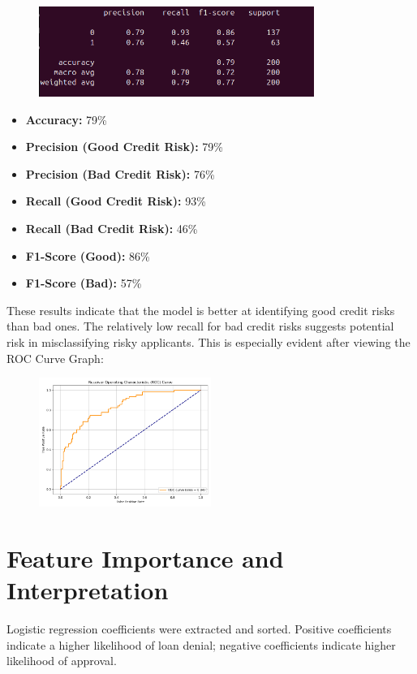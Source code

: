 \documentclass[12pt]{article}
\begin{document}
	\begin{figure}[h]
		\centering
		\includegraphics[width=0.8\textwidth]{AccScores.png}
		\label{fig:acc_scores}
	\end{figure}
	
	\begin{itemize}
		\item \textbf{Accuracy:} 79\%
		\item \textbf{Precision (Good Credit Risk):} 79\%
		\item \textbf{Precision (Bad Credit Risk):} 76\%
		\item \textbf{Recall (Good Credit Risk):} 93\%
		\item \textbf{Recall (Bad Credit Risk):} 46\%
		\item \textbf{F1-Score (Good):} 86\%
		\item \textbf{F1-Score (Bad):} 57\%
	\end{itemize}
	
	These results indicate that the model is better at identifying good credit risks than bad ones. The relatively low recall for bad credit risks suggests potential risk in misclassifying risky applicants. This is especially evident after viewing the ROC Curve Graph:
	
	\begin{figure}[h]
		\centering
		\includegraphics[width=0.5\textwidth]{ROCCurve.png}
	\end{figure}
	
	\section{Feature Importance and Interpretation}
	Logistic regression coefficients were extracted and sorted. Positive coefficients indicate a higher likelihood of loan denial; negative coefficients indicate higher likelihood of approval.
	
\end{document}
